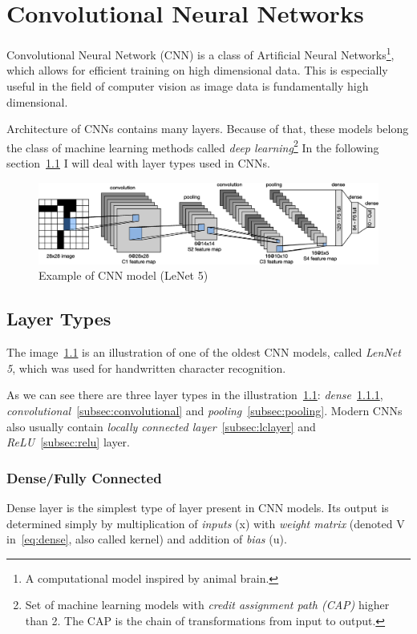 \chapter{Convolutional Neural Networks}\label{ch:cnn}
Convolutional Neural Network (CNN) is a class of Artificial Neural Networks\footnote{A computational model inspired by
animal brain.}, which allows for efficient training on high dimensional data.
This is especially useful in the field of computer vision as image data is fundamentally high dimensional.

Architecture of CNNs contains many layers.
Because of that, these models belong the class of machine learning methods called
\textit{deep learning}\footnote{Set of machine learning models with \textit{credit assignment path (CAP)} higher than 2.
The CAP is the chain of transformations from input to output.}
In the following section~\ref{sec:layer-types} I will deal with layer types used in CNNs.

\begin{figure}[H]
    \centering
    \includegraphics[width=\columnwidth]{images/cnn/lenet.eps}
    \caption{Example of CNN model (LeNet 5)~\cite{LeNet5}}
    \label{fig:cnn}
\end{figure}

\section{Layer Types}\label{sec:layer-types}
The image~\ref{fig:cnn} is an illustration of one of the oldest CNN models, called \textit{LenNet 5}, which was used for
handwritten character recognition.

As we can see there are three layer types in the illustration~\ref{fig:cnn}: \textit{dense}~\ref{subsec:dense},
\textit{convolutional}~\ref{subsec:convolutional} and \textit{pooling}~\ref{subsec:pooling}.
Modern CNNs also usually contain \textit{locally connected layer}~\ref{subsec:lclayer} and
\textit{ReLU}~\ref{subsec:relu} layer.

\subsection{Dense/Fully Connected}\label{subsec:dense}
Dense layer is the simplest type of layer present in CNN models.
Its output is determined simply by multiplication of \textit{inputs} (x) with \textit{weight matrix}
(denoted V in~\ref{eq:dense}, also called kernel) and addition of \textit{bias} (u).

